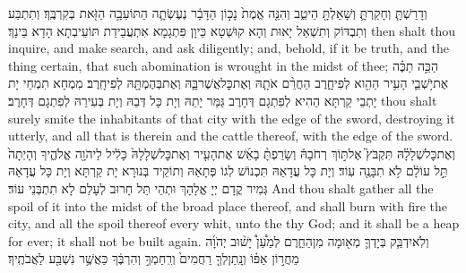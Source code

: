 {וְדָרַשְׁתָּ֧ וְחָקַרְתָּ֛ וְשָׁאַלְתָּ֖ הֵיטֵ֑ב וְהִנֵּ֤ה אֱמֶת֙ נָכ֣וֹן הַדָּבָ֔ר נֶעֶשְׂתָ֛ה הַתּוֹעֵבָ֥ה הַזֹּ֖את בְּקִרְבֶּֽךָ׃}
{וְתִתְבַּע וְתִבְדּוֹק וְתִשְׁאַל יָאוּת וְהָא קוּשְׁטָא כֵּיוָן פִּתְגָמָא אִתְעֲבֵידַת תּוֹעֵיבְתָא הָדָא בֵּינָךְ׃}
{then shalt thou inquire, and make search, and ask diligently; and, behold, if it be truth, and the thing certain, that such abomination is wrought in the midst of thee;}{}
{הַכֵּ֣ה תַכֶּ֗ה אֶת\maqqaf יֹ֥שְׁבֵ֛י הָעִ֥יר הַהִ֖וא לְפִי\maqqaf חָ֑רֶב הַחֲרֵ֨ם אֹתָ֧הּ וְאֶת\maqqaf כׇּל\maqqaf אֲשֶׁר\maqqaf בָּ֛הּ וְאֶת\maqqaf בְּהֶמְתָּ֖הּ לְפִי\maqqaf חָֽרֶב׃}
{מִמְחָא תִמְחֵי יָת יָתְבֵי קַרְתָּא הַהִיא לְפִתְגָם דְּחָרֶב גַּמַּר יָתַהּ וְיָת כָּל דְּבַהּ וְיָת בְּעִירַהּ לְפִתְגָם דְּחָרֶב׃}
{thou shalt surely smite the inhabitants of that city with the edge of the sword, destroying it utterly, and all that is therein and the cattle thereof, with the edge of the sword.}{}
{וְאֶת\maqqaf כׇּל\maqqaf שְׁלָלָ֗הּ תִּקְבֹּץ֮ אֶל\maqqaf תּ֣וֹךְ רְחֹבָהּ֒ וְשָׂרַפְתָּ֨ בָאֵ֜שׁ אֶת\maqqaf הָעִ֤יר וְאֶת\maqqaf כׇּל\maqqaf שְׁלָלָהּ֙ כָּלִ֔יל לַיהֹוָ֖ה אֱלֹהֶ֑יךָ וְהָיְתָה֙ תֵּ֣ל עוֹלָ֔ם לֹ֥א תִבָּנֶ֖ה עֽוֹד׃}
{וְיָת כָּל עֲדָאַהּ תִּכְנוֹשׁ לְגוֹ פְּתָאַהּ וְתוֹקֵיד בְּנוּרָא יָת קַרְתָּא וְיָת כָּל עֲדָאַהּ גְּמִיר קֳדָם יְיָ אֱלָהָךְ וּתְהֵי תֵּל חָרוּב לְעָלַם לָא תִתְבְּנֵי עוֹד׃}
{And thou shalt gather all the spoil of it into the midst of the broad place thereof, and shall burn with fire the city, and all the spoil thereof every whit, unto the \lord\space thy God; and it shall be a heap for ever; it shall not be built again.}{}
{וְלֹֽא\maqqaf יִדְבַּ֧ק בְּיָדְךָ֛ מְא֖וּמָה מִן\maqqaf הַחֵ֑רֶם לְמַ֩עַן֩ יָשׁ֨וּב יְהֹוָ֜ה מֵחֲר֣וֹן אַפּ֗וֹ וְנָֽתַן\maqqaf לְךָ֤ רַחֲמִים֙ וְרִֽחַמְךָ֣ וְהִרְבֶּ֔ךָ כַּאֲשֶׁ֥ר נִשְׁבַּ֖ע לַאֲבֹתֶֽיךָ׃}
